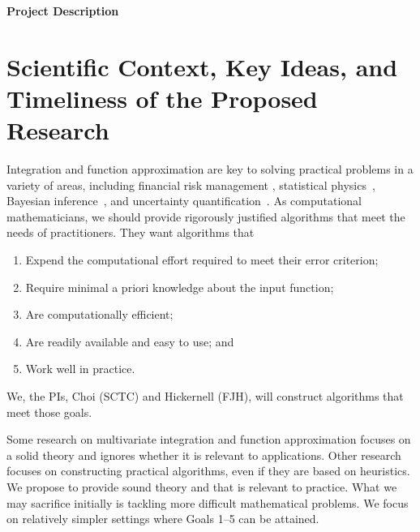 \documentclass[11pt]{NSFamsart}
\begin{document}

\centerline{\Large \textbf{Project Description}}
\vspace{-2ex}

\setcounter{tocdepth}{1}
\tableofcontents

\vspace{-6ex}

\section{Scientific Context, Key Ideas, and Timeliness of the Proposed Research}

Integration and function approximation are key to
solving practical problems in a variety of areas, including financial risk management \cite{Gla03}, 
statistical physics~\cite{LanBin14}, 
Bayesian inference~\cite{GelEtal13}, and uncertainty quantification~\cite{ForEtal09, Smi14a}.  As computational mathematicians, we should provide rigorously justified algorithms that meet the needs of practitioners.  They want algorithms that 
\begin{enumerate}[leftmargin = 15ex]
\renewcommand{\labelenumi}{\textbf{Goal \arabic{enumi}.}}
    \item \label{GoalOne} Expend the  
computational effort required to meet their error criterion;
\item \label{GoalTwo} Require minimal a priori knowledge about the input function;

\item \label{GoalThree} Are computationally efficient;

\item \label{GoalFour} Are readily available and easy to use; and

\item \label{GoalFive} Work well in practice.
\end{enumerate}
We, the PIs, Choi (SCTC) and Hickernell (FJH), will construct algorithms that meet those goals.

Some research on multivariate integration and function approximation focuses on a solid theory and ignores whether it is relevant to applications.  Other research focuses on constructing practical algorithms, even if they are based on heuristics.  We propose to provide sound theory and that is relevant to practice.  What we may sacrifice initially is tackling more difficult mathematical problems.  We focus on relatively simpler settings where Goals 1--5 can be attained.
\end{document}
